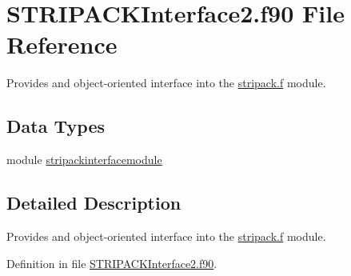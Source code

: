 \hypertarget{_s_t_r_i_p_a_c_k_interface2_8f90}{\section{S\+T\+R\+I\+P\+A\+C\+K\+Interface2.\+f90 File Reference}
\label{_s_t_r_i_p_a_c_k_interface2_8f90}
}


Provides and object-\/oriented interface into the \hyperlink{stripack_8f_source}{stripack.\+f} module.  


\subsection*{Data Types}
\begin{DoxyCompactItemize}
\item 
module \hyperlink{classstripackinterfacemodule}{stripackinterfacemodule}
\end{DoxyCompactItemize}


\subsection{Detailed Description}
Provides and object-\/oriented interface into the \hyperlink{stripack_8f_source}{stripack.\+f} module. 



Definition in file \hyperlink{_s_t_r_i_p_a_c_k_interface2_8f90_source}{S\+T\+R\+I\+P\+A\+C\+K\+Interface2.\+f90}.

